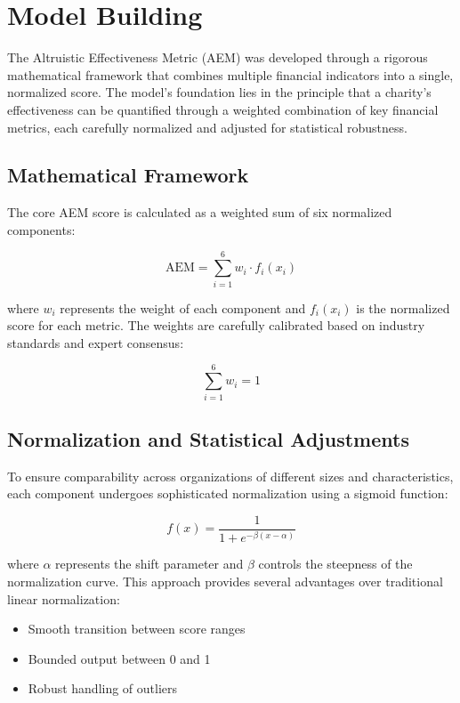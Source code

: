\section{Model Building}

The Altruistic Effectiveness Metric (AEM) was developed through a rigorous mathematical framework that combines multiple financial indicators into a single, normalized score. The model's foundation lies in the principle that a charity's effectiveness can be quantified through a weighted combination of key financial metrics, each carefully normalized and adjusted for statistical robustness.

\subsection{Mathematical Framework}

The core AEM score is calculated as a weighted sum of six normalized components:

\begin{equation}
    \text{AEM} = \sum_{i=1}^{6} w_i \cdot f_i(x_i)
\end{equation}

where $w_i$ represents the weight of each component and $f_i(x_i)$ is the normalized score for each metric. The weights are carefully calibrated based on industry standards and expert consensus:

\begin{equation}
    \sum_{i=1}^{6} w_i = 1
\end{equation}

\subsection{Normalization and Statistical Adjustments}

To ensure comparability across organizations of different sizes and characteristics, each component undergoes sophisticated normalization using a sigmoid function:

\begin{equation}
    f(x) = \frac{1}{1 + e^{-\beta(x - \alpha)}}
\end{equation}

where $\alpha$ represents the shift parameter and $\beta$ controls the steepness of the normalization curve. This approach provides several advantages over traditional linear normalization:
\begin{itemize}
    \item Smooth transition between score ranges
    \item Bounded output between 0 and 1
    \item Robust handling of outliers
\end{itemize}

